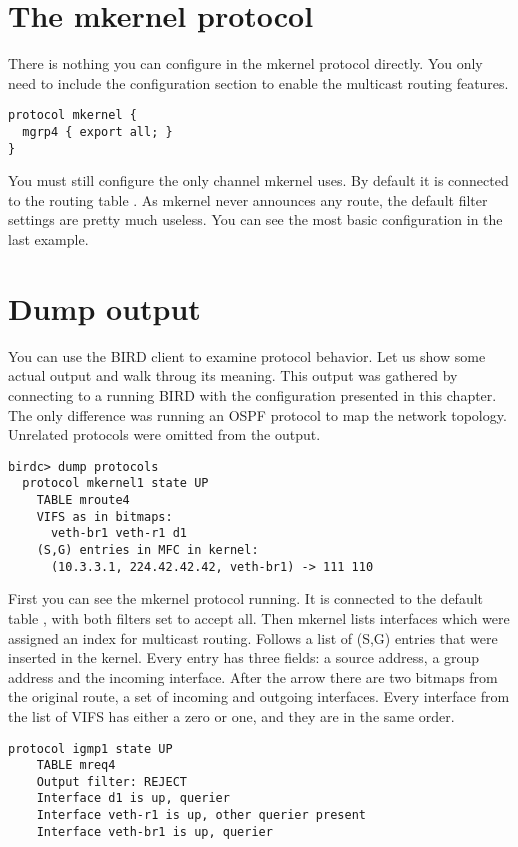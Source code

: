 \section{The mkernel protocol}

There is nothing you can configure in the mkernel protocol directly. You only
need to include the configuration section to enable the multicast routing
features.

\begin{lstlisting}
protocol mkernel {
  mgrp4 { export all; }
}
\end{lstlisting}

\noindent You must still configure the only channel mkernel uses. By default it
is connected to the routing table . As mkernel never announces any
route, the default filter settings are pretty much useless. You can see the
most basic configuration in the last example.

\section{Dump output}
You can use the BIRD client to examine protocol behavior. Let us show some
actual output and walk throug its meaning. This output was gathered by
connecting to a running BIRD with the configuration presented in this chapter.
The only difference was running an OSPF protocol to map the network topology.
Unrelated protocols were omitted from the output.

\begin{lstlisting}
birdc> dump protocols
  protocol mkernel1 state UP
    TABLE mroute4
    VIFS as in bitmaps:
      veth-br1 veth-r1 d1
    (S,G) entries in MFC in kernel:
      (10.3.3.1, 224.42.42.42, veth-br1) -> 111 110
\end{lstlisting}

First you can see the mkernel protocol running. It is connected to the default
table , with both filters set to accept all. Then mkernel lists
interfaces which were assigned an index for multicast routing. Follows a list
of (S,G) entries that were inserted in the kernel. Every entry has three
fields: a source address, a group address and the incoming interface. After the
arrow there are two bitmaps from the original route, a set of incoming and
outgoing interfaces. Every interface from the list of VIFS has either a zero or
one, and they are in the same order.

\begin{lstlisting}[firstnumber=8]
  protocol igmp1 state UP
    TABLE mreq4
    Output filter: REJECT
    Interface d1 is up, querier
    Interface veth-r1 is up, other querier present
    Interface veth-br1 is up, querier
\end{lstlisting}

